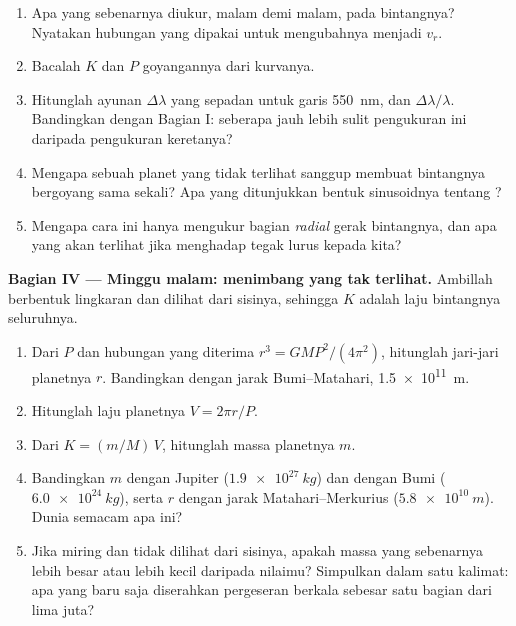 \begin{problem}
\begin{enumerate}[resume]
  \item Apa yang sebenarnya diukur, malam demi malam, pada \emph{} bintangnya?
        Nyatakan hubungan yang dipakai untuk mengubahnya menjadi $v_r$.
  \item Bacalah  $K$ dan  $P$ goyangannya dari kurvanya.
  \item Hitunglah ayunan $\Delta\lambda$ yang sepadan untuk garis \qty{550}{nm}, dan
        $\Delta\lambda/\lambda$. Bandingkan dengan Bagian I: seberapa jauh lebih sulit
        pengukuran ini daripada pengukuran keretanya?
  \item Mengapa sebuah planet yang tidak terlihat sanggup membuat bintangnya bergoyang sama
        sekali? Apa yang ditunjukkan bentuk sinusoidnya tentang ?
  \item Mengapa cara ini hanya mengukur bagian \emph{radial} gerak bintangnya, dan apa yang
        akan terlihat jika  menghadap tegak lurus kepada kita?
\end{enumerate}

\medskip
\noindent\textbf{Bagian IV --- Minggu malam: menimbang yang tak terlihat.}
Ambillah  berbentuk lingkaran dan dilihat dari sisinya, sehingga $K$ adalah laju
 bintangnya seluruhnya.
\begin{enumerate}[resume]
  \item Dari $P$ dan hubungan yang diterima $r^3 = G M P^2/(4\pi^2)$, hitunglah jari-jari
         planetnya $r$. Bandingkan dengan jarak Bumi--Matahari, \qty{1.5e11}{m}.
  \item Hitunglah laju  planetnya $V = 2\pi r/P$.
  \item Dari $K = (m/M)\,V$, hitunglah massa planetnya $m$.
  \item Bandingkan $m$ dengan Jupiter ($\qty{1.9e27}{kg}$) dan dengan Bumi
        ($\qty{6.0e24}{kg}$), serta $r$ dengan jarak Matahari--Merkurius
        ($\qty{5.8e10}{m}$). Dunia semacam apa ini?
  \item Jika  miring dan tidak dilihat dari sisinya, apakah massa yang sebenarnya
        lebih besar atau lebih kecil daripada nilaimu? Simpulkan dalam satu kalimat: apa
        yang baru saja diserahkan pergeseran berkala sebesar satu bagian dari lima juta?
\end{enumerate}
\end{problem}
